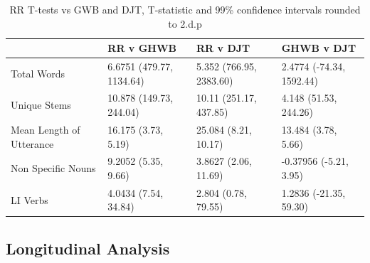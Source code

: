 \documentclass[12pt]{article}
\begin{document}
\begin{table}[H]
	\begin{center}
	\begin{tabular}{ | p{3cm} | p{3cm} | p{3cm} | p{3cm} |}
		\hline
		& RR v GHWB & RR v DJT & GHWB v DJT \\ \hline
		Total Words & 6.6751 (479.77, 1134.64) & 5.352 (766.95, 2383.60) & 2.4774 (-74.34, 1592.44) \\ \hline
		Unique Stems & 10.878 (149.73, 244.04) & 10.11 (251.17, 437.85) & 4.148 (51.53, 244.26) \\ \hline
		Mean Length of Utterance & 16.175 (3.73, 5.19) & 25.084 (8.21, 10.17)  & 13.484 (3.78, 5.66) \\ \hline	
		Non Specific Nouns & 9.2052 (5.35, 9.66) & 3.8627 (2.06, 11.69) & -0.37956 (-5.21, 3.95) \\ \hline
		LI Verbs & 4.0434 (7.54, 34.84) & 2.804 (0.78, 79.55) & 1.2836 (-21.35, 59.30)\\ \hline
	\end{tabular}
	\caption{\label{tab:table-name}RR T-tests vs GWB and DJT, T-statistic and 99\% confidence intervals rounded to 2.d.p}
	\end{center} 
\end{table}

\subsection{Longitudinal Analysis}
\end{document}
